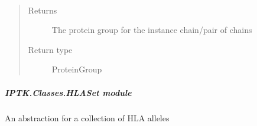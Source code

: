 \documentclass[letterpaper,10pt,english]{sphinxmanual}
\begin{document}
\begin{fulllineitems}
\begin{fulllineitems}
\end{fulllineitems}


\begin{fulllineitems}
\label{\detokenize{IPTK.Classes:IPTK.Classes.HLAMolecules.HLAMolecule.get_protein_group}}~\begin{quote}\begin{description}
\item[{Returns}] \leavevmode
The protein group for the instance chain/pair of chains

\item[{Return type}] \leavevmode
ProteinGroup

\end{description}\end{quote}

\end{fulllineitems}


\end{fulllineitems}



\subparagraph{IPTK.Classes.HLASet module}
\label{\detokenize{IPTK.Classes:module-IPTK.Classes.HLASet}}\label{\detokenize{IPTK.Classes:iptk-classes-hlaset-module}}
An abstraction for a collection of HLA alleles
\end{document}
